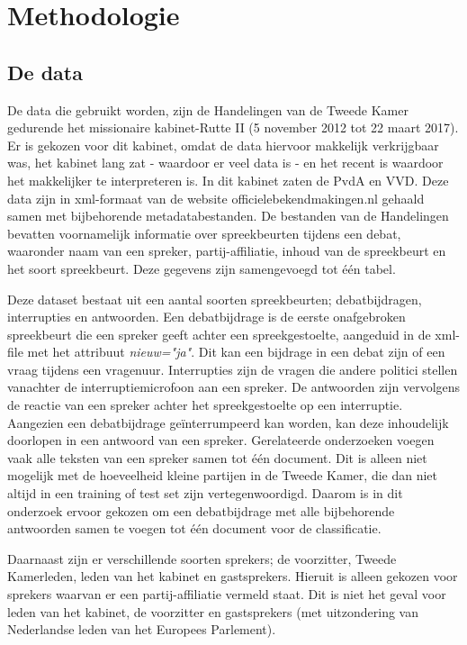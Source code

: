 \section{Methodologie}
\label{sec:meth}


\subsection{De data}
\label{data}
De data die gebruikt worden, zijn de Handelingen van de Tweede Kamer gedurende het missionaire kabinet-Rutte II (5 november 2012 tot 22 maart 2017). Er is gekozen voor dit kabinet, omdat de data hiervoor makkelijk verkrijgbaar was, het kabinet lang zat - waardoor er veel data is - en het recent is waardoor het makkelijker te interpreteren is. In dit kabinet zaten de PvdA en VVD. Deze data zijn in xml-formaat van de website officielebekendmakingen.nl gehaald samen met bijbehorende metadatabestanden. De bestanden van de Handelingen bevatten voornamelijk informatie over spreekbeurten tijdens een debat, waaronder naam van een spreker, partij-affiliatie, inhoud van de spreekbeurt en het soort spreekbeurt. Deze gegevens zijn samengevoegd tot één tabel.\par
Deze dataset bestaat uit een aantal soorten spreekbeurten; debatbijdragen, interrupties en antwoorden. Een debatbijdrage is de eerste onafgebroken spreekbeurt die een spreker geeft achter een spreekgestoelte, aangeduid in de xml-file met het attribuut \textit{nieuw="ja"}. Dit kan een bijdrage in een debat zijn of een vraag tijdens een vragenuur. Interrupties zijn de vragen die andere politici stellen vanachter de interruptiemicrofoon aan een spreker. De antwoorden zijn vervolgens de reactie van een spreker achter het spreekgestoelte op een interruptie. Aangezien een debatbijdrage geïnterrumpeerd kan worden, kan deze inhoudelijk doorlopen in een antwoord van een spreker.  Gerelateerde onderzoeken voegen vaak alle teksten van een spreker samen tot één document. Dit is alleen niet mogelijk met de hoeveelheid kleine partijen in de Tweede Kamer, die dan niet altijd in een training of test set zijn vertegenwoordigd. Daarom is in dit onderzoek ervoor gekozen om een debatbijdrage met alle bijbehorende antwoorden samen te voegen tot één document voor de classificatie.\par
Daarnaast zijn er verschillende soorten sprekers; de voorzitter, Tweede Kamerleden, leden van het kabinet en gastsprekers. Hieruit is alleen gekozen voor sprekers waarvan er een partij-affiliatie vermeld staat. Dit is niet het geval voor leden van het kabinet, de voorzitter en gastsprekers (met uitzondering van Nederlandse leden van het Europees Parlement).\par
